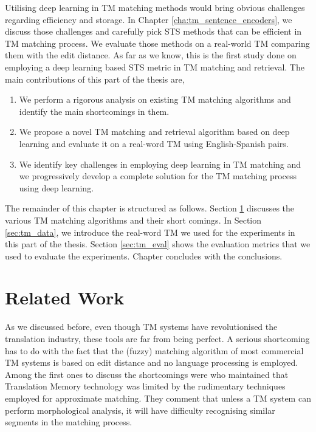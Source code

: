 Utilising deep learning in TM matching methods would bring obvious challenges regarding efficiency and storage. In Chapter \ref{cha:tm_sentence_encoders}, we discuss those challenges and carefully pick STS methods that can be efficient in TM matching process. We evaluate those methods on a real-world TM comparing them with the edit distance. As far as we know, this is the first study done on employing a deep learning based STS metric in TM matching and retrieval. The main contributions of this part of the thesis are, 

\begin{enumerate}
	\item We perform a rigorous analysis on existing TM matching algorithms and identify the main shortcomings in them.
	\item We propose a novel TM matching and retrieval algorithm based on deep learning and evaluate it on a real-word TM using English-Spanish pairs. 
	\item We identify key challenges in employing deep learning in TM matching and we progressively develop a complete solution for the TM matching process using deep learning. 
\end{enumerate}

The remainder of this chapter is structured as follows. Section \ref{sec:tm_related} discusses the various TM matching algorithms and their short comings. In Section \ref{sec:tm_data}, we introduce the real-word TM we used for the experiments in this part of the thesis. Section \ref{sec:tm_eval} shows the evaluation metrics that we used to evaluate the experiments. Chapter concludes with the conclusions. 

\section{Related Work}
\label{sec:tm_related}
As we discussed before, even though TM systems have revolutionised the translation industry, these tools are far from being perfect. A serious shortcoming has to do with the fact that the (fuzzy) matching algorithm of most commercial TM systems is based on edit distance and no language processing is employed. Among the first ones to discuss the shortcomings were \citet{10.5555/648180.749379} who maintained that Translation Memory technology was limited by the rudimentary techniques employed for approximate matching.  They comment that unless a TM system can perform morphological analysis, it will have difficulty recognising similar segments in the matching process.

